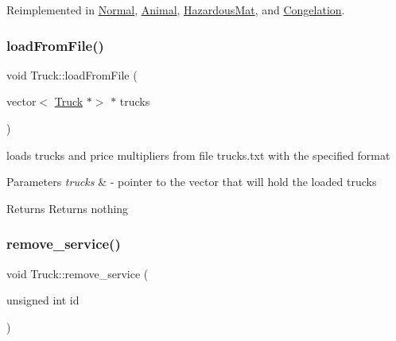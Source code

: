 Reimplemented in \hyperlink{class_normal_ade6add2ee09e701113534c97e2a03307}{Normal}, \hyperlink{class_animal_a1e99083943239209f4fbe79380ea5991}{Animal}, \hyperlink{class_hazardous_mat_ab07463da3e9a5d3b8933d2b01332ed00}{Hazardous\+Mat}, and \hyperlink{class_congelation_ac2f7cb9aeeeb9428a9a973e6a2c63942}{Congelation}.

\mbox{\label{class_truck_ae2d129e4cdd6760feee9a81421d40e17}} 
\subsubsection{\texorpdfstring{load\+From\+File()}{loadFromFile()}}
{\footnotesize\ttfamily void Truck\+::load\+From\+File (\begin{DoxyParamCaption}\item[{vector$<$ \hyperlink{class_truck}{Truck} $\ast$$>$ $\ast$}]{trucks }\end{DoxyParamCaption})\hspace{0.3cm}{\ttfamily [static]}}



loads trucks and price multipliers from file trucks.\+txt with the specified format 


\begin{DoxyParams}{Parameters}
{\em trucks} & -\/ pointer to the vector that will hold the loaded trucks \\
\hline
\end{DoxyParams}
\begin{DoxyReturn}{Returns}
Returns nothing 
\end{DoxyReturn}
\mbox{\label{class_truck_a0abc7397fd6dba0eeeb2b5ae3e225fd1}} 
\subsubsection{\texorpdfstring{remove\+\_\+service()}{remove\_service()}}
{\footnotesize\ttfamily void Truck\+::remove\+\_\+service (\begin{DoxyParamCaption}\item[{unsigned int}]{id }\end{DoxyParamCaption})}



